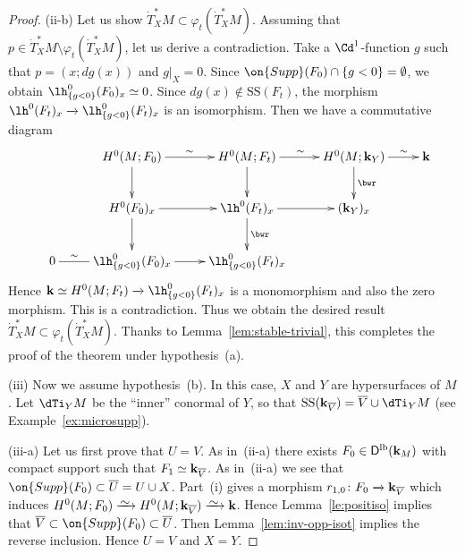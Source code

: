 \documentclass[12pt,leqno]{article}
\theoremstyle{definition}
\def\phi{{\varphi}}
\newcommand{\cor}{{\bf k}}
\renewcommand{\to}[1][]{\xrightarrow[]{#1}}
\newcommand{\isoto}[1][]{\xrightarrow[#1]%
{{\raisebox{-.6ex}[0ex][-.6ex]{$\mspace{1mu}\sim\mspace{2mu}$}}}}
\newcommand{\cl}{\colon}
\newcommand{\ol}{\overline}
\newcommand{\eqn}{\begin{eqnarray*}}
\newcommand{\eneqn}{\end{eqnarray*}}
\newcommand{\Supp}{\on{Supp}}
\newcommand{\Der}[1][]{\mathsf{D}^{#1}}
\newcommand{\Derlb}{\Der[\mathrm{lb}]}
\newcommand{\SSi}{\mathrm{SS}}
\newcommand{\dT}{{\dot{T}}}
\numberwithin{equation}{section}
\begin{document}
\begin{proof}
\medskip\noindent
(ii-b) Let us show
$\dT^*_XM\subset\phi_t(\dT^*_XM)$.
Assuming that $p\in \dT^*_XM \setminus \phi_t(\dT^*_XM)$,
let us derive a contradiction.
Take a $\Cd^1$-function $g$ such that
$p=(x;dg(x))$ and $g\vert_X=0$. 
Since $\Supp(F_0)\cap \{g<0\}=\emptyset$, we obtain $\lh^0_{\{g<0\}}(F_0)_x\simeq0$.
Since $dg(x)\not\in\SSi(F_t)$, the morphism
$\lh^0(F_t)_x\to\lh^0_{\{g<0\}}(F_t)_x$ is an isomorphism.
Then we have a commutative diagram
\eqn
&&\xymatrix{
&H^0(M; F_0) \ar[r]^\sim \ar[d] & 
H^0(M; F_t) \ar[r]^\sim \ar[d] & 
H^0(M; \cor_Y) \ar[d]^{\bwr}\ar[r]^-{\sim}&\cor  \\
&H^0(F_0)_x\ar[d] \ar[r]&\lh^0(F_t)_x\ar[d]^-{\bwr} \ar[r] & (\cor_Y)_x \\
0\ar@{-}[r]^-{\sim}&\lh^0_{\{g<0\}}(F_0)_x\ar[r]&
\lh^0_{\{g<0\}}(F_t)_x}
\eneqn
Hence $\cor\simeq H^0(M; F_t)\to\lh^0_{\{g<0\}}(F_t)_x$ is a monomorphism and 
also the zero morphism. This is a contradiction.
Thus we obtain the desired result $\dT^*_XM\subset \phi_t(\dT^*_XM)$.
Thanks to Lemma~\ref{lem:stable-trivial}, this completes the proof of the theorem under hypothesis~(a).


\bigskip\noindent
(iii) Now we assume hypothesis~(b).
In this case, $X$ and $Y$ are hypersurfaces of $M$.
Let $\dTi_YM$ be the ``inner'' conormal of $Y$, so that
$\SSi(\cor_{\ol V}) = \ol{V} \cup \dTi_YM$ (see
Example~\ref{ex:microsupp}).

\smallskip\noindent
(iii-a) Let us first prove that $U=V$. As in~(ii-a) there exists
$F_0\in \Derlb(\cor_M)$ with compact support such that
$F_1\simeq \cor_{\ol V}$. As in~(ii-a) we see that $\Supp(F_0) \subset 
\ol{U}=U\cup X$.
Part~(i) gives a morphism $r_{1,0}\cl F_0\to \cor_{\ol V}$ which induces
$H^0(M; F_0) \isoto H^0(M; \cor_{\ol V})\isoto\cor$.  
Hence Lemma~\ref{le:positiso} implies that
$\ol{V}\subset \Supp(F_0) \subset \ol{U}$.
Then Lemma~\ref{lem:inv-opp-isot} implies the reverse inclusion.
Hence $U = V$ and $X=Y$.


\end{proof}
\end{document}
